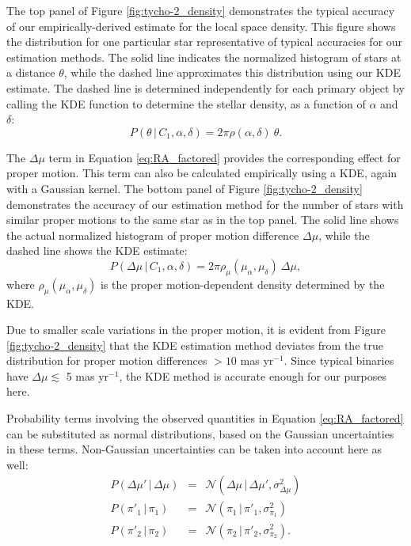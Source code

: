 \documentclass[usenatbib]{mnras}
\newcommand{\given}{\,|\,}
\begin{document}
The top panel of Figure \ref{fig:tycho-2_density} demonstrates the typical accuracy of our empirically-derived estimate for the local space density. This figure shows the distribution for one particular star representative of typical accuracies for our estimation methods. The solid line indicates the normalized histogram of stars at a distance $\theta$, while the dashed line approximates this distribution using our KDE estimate. The dashed line is determined independently for each primary object by calling the KDE function to determine the stellar density, as a function of $\alpha$ and $\delta$:
\begin{equation}
P(\theta \given C_1, \alpha, \delta) = 2 \pi \rho(\alpha, \delta)\ \theta. \label{eq:P_theta}
\end{equation}


The $\Delta \mu$ term in Equation \ref{eq:RA_factored} provides the corresponding effect for proper motion. This term can also be calculated empirically using a KDE, again with a Gaussian kernel. The bottom panel of Figure \ref{fig:tycho-2_density} demonstrates the accuracy of our estimation method for the number of stars with similar proper motions to the same star as in the top panel. The solid line shows the actual normalized histogram of proper motion difference $\Delta \mu$, while the dashed line shows the KDE estimate: 
\begin{equation}
P(\Delta \mu \given C_1, \alpha, \delta) = 2 \pi \rho_{\mu}(\mu_{\alpha}, \mu_{\delta})\ \Delta \mu, \label{eq:P_mu}
\end{equation}
where $\rho_{\mu}(\mu_{\alpha}, \mu_{\delta})$ is the proper motion-dependent density determined by the KDE.

Due to smaller scale variations in the proper motion, it is evident from Figure \ref{fig:tycho-2_density} that the KDE estimation method deviates from the true distribution for proper motion differences $>10$ mas yr$^{-1}$. Since typical binaries have $\Delta \mu \lesssim$ 5 mas yr$^{-1}$, the KDE method is accurate enough for our purposes here. 




Probability terms involving the observed quantities in Equation \ref{eq:RA_factored} can be substituted as normal distributions, based on the Gaussian uncertainties in these terms. Non-Gaussian uncertainties can be taken into account here as well:
\begin{eqnarray}
P(\Delta \mu' \given \Delta \mu) &=& \mathcal{N}(\Delta \mu \given \Delta \mu', \sigma^2_{\Delta \mu}) \label{eq:delta_mu_uncertainty} \\
P(\pi'_1 \given \pi_1) &=& \mathcal{N}(\pi_1 \given \pi'_1, \sigma^2_{\pi_1}) \label{eq:pi_1_uncertainty} \\
P(\pi'_2 \given \pi_2) &=& \mathcal{N}(\pi_2 \given \pi'_2, \sigma^2_{\pi_2}). \label{eq:pi_2_uncertainty} \\
\end{eqnarray}
\end{document}
